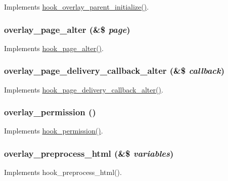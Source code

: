 \label{overlay_8module_abdd40e3e9b268d5bf86e401d31c3279f}
Implements \hyperlink{group__hooks_ga4f7d60aad2768e7b8fac11839ea9b874}{hook\_\-overlay\_\-parent\_\-initialize()}. \hypertarget{overlay_8module_a6562f3cdc2016db35295e1c97a2de3f2}{
\subsubsection[{overlay\_\-page\_\-alter}]{\setlength{\rightskip}{0pt plus 5cm}overlay\_\-page\_\-alter (\&\$ {\em page})}}
\label{overlay_8module_a6562f3cdc2016db35295e1c97a2de3f2}
Implements \hyperlink{group__hooks_gaa965aa8f38b48aed1a19c556c199145f}{hook\_\-page\_\-alter()}. \hypertarget{overlay_8module_a54e376c8ac21f0bbec738c1223a07a33}{
\subsubsection[{overlay\_\-page\_\-delivery\_\-callback\_\-alter}]{\setlength{\rightskip}{0pt plus 5cm}overlay\_\-page\_\-delivery\_\-callback\_\-alter (\&\$ {\em callback})}}
\label{overlay_8module_a54e376c8ac21f0bbec738c1223a07a33}
Implements \hyperlink{group__hooks_gaee6a1d02d5046d47069a8e385385ef15}{hook\_\-page\_\-delivery\_\-callback\_\-alter()}. \hypertarget{overlay_8module_a85176c474764d79629d986607de8d66e}{
\subsubsection[{overlay\_\-permission}]{\setlength{\rightskip}{0pt plus 5cm}overlay\_\-permission ()}}
\label{overlay_8module_a85176c474764d79629d986607de8d66e}
Implements \hyperlink{group__hooks_ga2b22b45f4925f2478412477bae329713}{hook\_\-permission()}. \hypertarget{overlay_8module_a8f2deaecc65693dae5a5e7dc57f20315}{
\subsubsection[{overlay\_\-preprocess\_\-html}]{\setlength{\rightskip}{0pt plus 5cm}overlay\_\-preprocess\_\-html (\&\$ {\em variables})}}
\label{overlay_8module_a8f2deaecc65693dae5a5e7dc57f20315}
Implements hook\_\-preprocess\_\-html().

